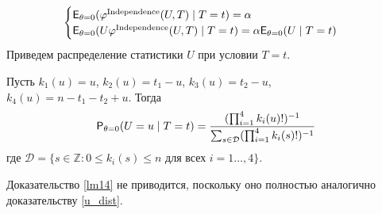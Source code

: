     $$
    \begin{cases}
        \mathsf{E}_{\theta=0}(\varphi^{\text{Independence}}(U,T) \mid T=t)=\alpha \\
        \mathsf{E}_{\theta=0}(U\varphi^{\text{Independence}}(U,T) \mid T=t)=\alpha \mathsf{E}_{\theta=0}(U \mid T=t)
    \end{cases}
    $$
    Приведем распределение статистики $U$ при условии $T=t$.
\begin{lemma}\label{lm14}
    Пусть $k_1(u)=u$, $k_2(u)=t_1-u$, $k_3(u)=t_2-u$,\\
    $k_4(u)=n-t_1-t_2+u$.
        Тогда
        $$\mathsf{P}_{\theta=0}(U=u \mid T=t)=\dfrac{(\prod_{i=1}^4 k_i(u)!)^{-1}}
            {\sum_{s\in \mathcal{D}} (\prod_{i=1}^4 k_i(s)!)^{-1}}$$
        где $\mathcal{D}=\{s \in \mathbb{Z}: 0\leq k_i(s) \leq n \text{ для всех } i=1\ldots,4\}$.
\end{lemma}
Доказательство \autoref{lm14} не приводится, поскольку оно полностью 
аналогично доказательству \autoref{u_dist}.


